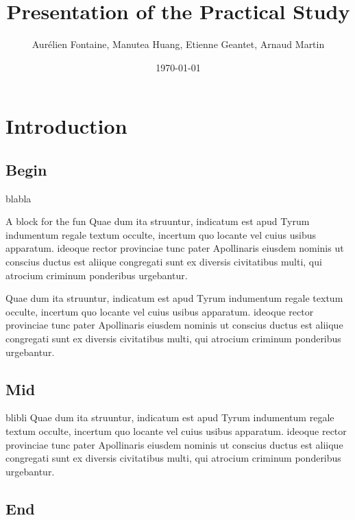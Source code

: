 \documentclass[a4paper,10pt]{beamer}
\title{Presentation of the Practical Study}
\author[Groupe 3INFO]{Aurélien Fontaine, Manutea Huang, Etienne Geantet, Arnaud Martin}
\institute[INSA de Rennes]{Institut National des Sciences Appliquées de Rennes}
\date{\today}
\begin{document}
	\begin{frame}
		\titlepage
	\end{frame}
	
	\begin{frame}
		\tableofcontents
	\end{frame}
	
	\section{Introduction}
	
		\subsection{Begin}
	
			\begin{frame}{blabla}
				\begin{block}{A block for the fun}
					Quae dum ita struuntur, indicatum est apud Tyrum indumentum regale textum occulte, incertum quo locante vel cuius usibus apparatum. ideoque rector provinciae tunc pater Apollinaris eiusdem nominis ut conscius ductus est aliique congregati sunt ex diversis civitatibus multi, qui atrocium criminum ponderibus urgebantur.
				\end{block}
				Quae dum ita struuntur, indicatum est apud Tyrum indumentum regale textum occulte, incertum quo locante vel cuius usibus apparatum. ideoque rector provinciae tunc pater Apollinaris eiusdem nominis ut conscius ductus est aliique congregati sunt ex diversis civitatibus multi, qui atrocium criminum ponderibus urgebantur.
			\end{frame}
			
		\subsection{Mid}
			
			\begin{frame}{blibli}
				Quae dum ita struuntur, indicatum est apud Tyrum indumentum regale textum occulte, incertum quo locante vel cuius usibus apparatum. ideoque rector provinciae tunc pater Apollinaris eiusdem nominis ut conscius ductus est aliique congregati sunt ex diversis civitatibus multi, qui atrocium criminum ponderibus urgebantur.
			\end{frame}
		
		\subsection{End}
		
\end{document}
